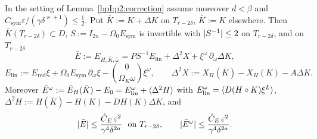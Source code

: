 \begin{lemma}\label{bpI:p2:newton-error}
In the setting of Lemma~\ref{bpI:p2:correction} assume moreover $d<\beta$ and $C_{\mathrm{sym}}\varepsilon/(\gamma\delta^{\varkappa+1})\le\frac12$. Put $\bar K:=K+\Delta K$ on $T_{r-2\delta}$, $\bar K:=K$ elsewhere. Then $\bar K(T_{r-2\delta})\subset D$, $S:=I_{2n}-\Omega_0E_{\mathrm{sym}}$ is invertible with $\lvert S^{-1}\rvert\le2$ on $T_{r-2\delta}$, and on $T_{r-2\delta}$
\begin{equation}\label{bpI:p2:newerr}
\bar E:=E_{H,\bar K,\bar\omega}=PS^{-1}E_{\mathrm{lin}}+\Delta^2X+\xi^\omega\,\partial_\omega\Delta K,
\end{equation}
\[
E_{\mathrm{lin}}:=E_{\mathrm{red}}\xi+\Omega_0E_{\mathrm{sym}}\,\partial_\omega\xi-\binom0{\Omega_K\omega}\xi^\omega,\qquad\Delta^2X:=X_H(\bar K)-X_H(K)-A\Delta K.
\]
Moreover $\bar E^\omega:=\bar E_H(\bar K)-E_0=E^\omega_{\mathrm{lin}}+\langle \Delta^2H\rangle$ with $E^\omega_{\mathrm{lin}}=\langle D(H\circ K)\xi^L\rangle$, $\Delta^2H:=H(\bar K)-H(K)-DH(K)\Delta K$, and
\[
\lvert \bar E\rvert\le\frac{\hat C_E\,\varepsilon^2}{\gamma^4\delta^{2a}}\ \text{ on }T_{r-2\delta},\qquad\lvert \bar E^\omega\rvert\le\frac{\hat C_E\,\varepsilon^2}{\gamma^4\delta^{2a}}.
\]
\end{lemma}
